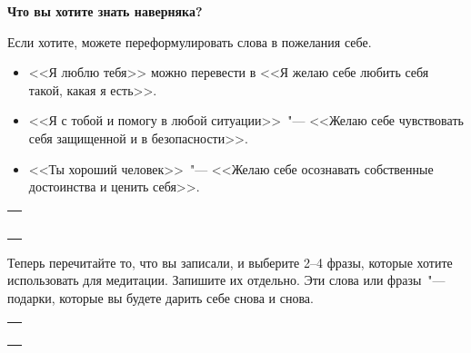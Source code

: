 \vspace{4ex}

{\large \textbf{Что вы хотите знать наверняка?}}

\vspace{2ex}

\begin{itemize}
	\itemWritingHand Если хотите, можете переформулировать слова в пожелания себе.
	\begin{itemize}
		\item <<Я люблю тебя>> можно перевести в <<Я желаю себе любить себя такой, какая я есть>>.
		
		\item <<Я с тобой и помогу в любой ситуации>>~"--- <<Желаю себе чувствовать себя защищенной и в безопасности>>.
		
		\item <<Ты хороший человек>>~"--- <<Желаю себе осознавать собственные достоинства и ценить себя>>.
	\end{itemize}
\end{itemize}
\setlength{\extrarowheight}{2mm}
\begin{tabularx}{\textwidth}{X}
	\\
	\arrayrulecolor{gray}\hline\\
	\hline\\
	\hline\\
	\hline\\
	\hline\\
	\hline\\
\end{tabularx}
\setlength{\extrarowheight}{0mm}
\begin{itemize}
	\itemWritingHand Теперь перечитайте то, что вы записали, и выберите 2--4 фразы, которые хотите использовать для медитации. Запишите их отдельно. Эти слова или фразы~"--- подарки, которые вы будете дарить себе снова и снова.
\end{itemize}
\setlength{\extrarowheight}{2mm}
\begin{tabularx}{\textwidth}{X}
	\\
	\arrayrulecolor{gray}\hline\\
	\hline\\
	\hline\\
	\hline\\
	\hline\\
\end{tabularx}
\setlength{\extrarowheight}{0mm}

